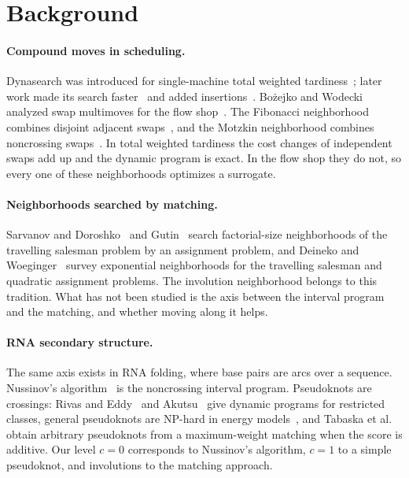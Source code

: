 \documentclass{article}
\begin{document}
\section{Background}

\paragraph{Compound moves in scheduling.} Dynasearch was introduced for
single-machine total weighted tardiness~\cite{congram2002}; later work
made its search faster~\cite{ergun2006} and added
insertions~\cite{grosso2004}. Bo\.zejko and Wodecki analyzed swap
multimoves for the flow shop~\cite{bozejko2007}. The Fibonacci
neighborhood combines disjoint adjacent
swaps~\cite{fibonacci_own,bozejko2026sr}, and the Motzkin neighborhood
combines noncrossing swaps~\cite{motzkin_own}. In total weighted
tardiness the cost changes of independent swaps add up and the dynamic
program is exact. In the flow shop they do not, so every one of these
neighborhoods optimizes a surrogate.

\paragraph{Neighborhoods searched by matching.} Sarvanov and
Doroshko~\cite{sarvanov1981} and Gutin~\cite{gutin1999} search
factorial-size neighborhoods of the travelling salesman problem by an
assignment problem, and Deineko and Woeginger~\cite{deineko2000} survey
exponential neighborhoods for the travelling salesman and quadratic
assignment problems. The involution neighborhood belongs to this
tradition. What has not been studied is the axis between the interval
program and the matching, and whether moving along it helps.

\paragraph{RNA secondary structure.} The same axis exists in RNA
folding, where base pairs are arcs over a sequence. Nussinov's
algorithm~\cite{nussinov1978} is the noncrossing interval program.
Pseudoknots are crossings: Rivas and Eddy~\cite{rivas1999} and
Akutsu~\cite{akutsu2000} give dynamic programs for restricted classes,
general pseudoknots are NP-hard in energy models~\cite{lyngso2000}, and
Tabaska et al.~\cite{tabaska1998} obtain arbitrary pseudoknots from a
maximum-weight matching when the score is additive. Our level $c=0$
corresponds to Nussinov's algorithm, $c=1$ to a simple pseudoknot, and
involutions to the matching approach.
\end{document}
